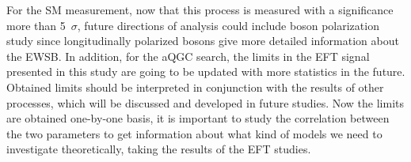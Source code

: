For the SM measurement, now that this process is measured with a significance more than 5~$\sigma$, future directions of analysis could include boson polarization study since longitudinally polarized bosons give more detailed information about the EWSB.
In addition, for the aQGC search, the limits in the EFT signal presented in this study are going to be updated with more statistics in the future. 
Obtained limits should be interpreted in conjunction with the results of other processes, which will be discussed and developed in future studies. Now the limits are obtained one-by-one basis, it is important to study the correlation between the two parameters to get information about what kind of models we need to investigate theoretically, taking the results of the EFT studies.




